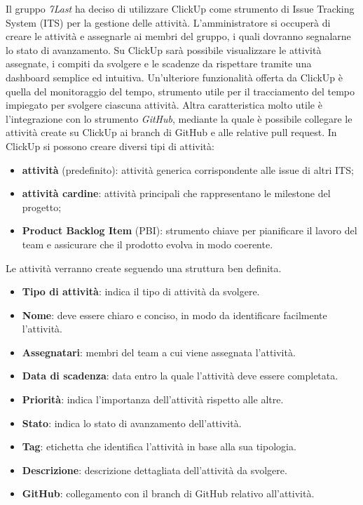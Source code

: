 Il gruppo \textit{7Last} ha deciso di utilizzare ClickUp come strumento di Issue Tracking System (ITS) per la gestione delle attività. L'amministratore si occuperà di creare le attività e assegnarle ai membri del gruppo, i quali dovranno segnalarne lo stato di avanzamento. Su ClickUp sarà possibile visualizzare le attività assegnate, i compiti da svolgere e le scadenze da rispettare tramite una dashboard semplice ed intuitiva. Un'ulteriore funzionalità offerta da ClickUp è quella del monitoraggio del tempo, strumento utile per il tracciamento del tempo impiegato per svolgere ciascuna attività. Altra caratteristica molto utile è l'integrazione con lo strumento \textit{GitHub}, mediante la quale è possibile collegare le attività create su ClickUp ai branch di GitHub e alle relative pull request.
In ClickUp si possono creare diversi tipi di attività:
\begin{itemize}
    \item \textbf{attività} (predefinito): attività generica corrispondente alle issue di altri ITS;
    \item \textbf{attività cardine}: attività principali che rappresentano le milestone del progetto;
    \item \textbf{Product Backlog Item} (PBI): strumento chiave per pianificare il lavoro del team e assicurare che il prodotto evolva in modo coerente.    
\end{itemize}
Le attività verranno create seguendo una struttura ben definita.
\begin{itemize}
    \item \textbf{Tipo di attività}: indica il tipo di attività da svolgere.
    \item \textbf{Nome}: deve essere chiaro e conciso, in modo da identificare facilmente l'attività.
    \item \textbf{Assegnatari}: membri del team a cui viene assegnata l'attività.
    \item \textbf{Data di scadenza}: data entro la quale l'attività deve essere completata.
    \item \textbf{Priorità}: indica l'importanza dell'attività rispetto alle altre.
    \item \textbf{Stato}: indica lo stato di avanzamento dell'attività.
    \item \textbf{Tag}: etichetta che identifica l'attività in base alla sua tipologia.
    \item \textbf{Descrizione}: descrizione dettagliata dell'attività da svolgere.
    \item \textbf{GitHub}: collegamento con il branch di GitHub relativo all'attività.
\end{itemize}

